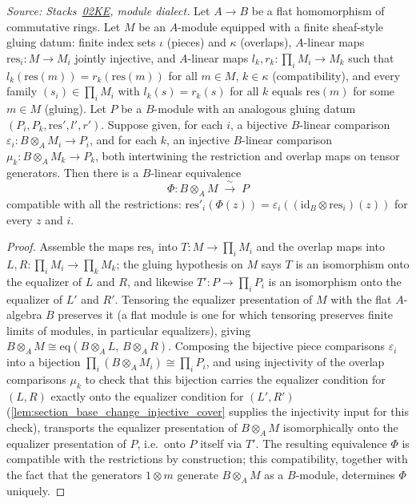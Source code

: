 \begin{lemma}
  \label{lem:section_base_change_gluing_ladder}
  \leanok
  \textit{Source: Stacks~\href{https://stacks.math.columbia.edu/tag/02KE}{02KE},
  module dialect.}
  Let \(A \to B\) be a flat homomorphism of commutative rings. Let \(M\) be
  an \(A\)-module equipped with a finite sheaf-style gluing datum: finite
  index sets \(\iota\) (pieces) and \(\kappa\) (overlaps), \(A\)-linear maps
  \(\mathrm{res}_i : M \to M_i\) jointly injective, and \(A\)-linear maps
  \(l_k, r_k : \prod_i M_i \to M_k\) such that \(l_k(\mathrm{res}(m)) =
  r_k(\mathrm{res}(m))\) for all \(m \in M\), \(k \in \kappa\)
  (compatibility), and every family \((s_i) \in \prod_i M_i\) with
  \(l_k(s) = r_k(s)\) for all \(k\) equals \(\mathrm{res}(m)\) for some
  \(m \in M\) (gluing). Let \(P\) be a \(B\)-module with an analogous
  gluing datum \((P_i, P_k, \mathrm{res}', l', r')\). Suppose given, for
  each \(i\), a bijective \(B\)-linear comparison
  \(\varepsilon_i : B \otimes_A M_i \to P_i\), and for each \(k\), an
  injective \(B\)-linear comparison \(\mu_k : B \otimes_A M_k \to P_k\),
  both intertwining the restriction and overlap maps on tensor generators.
  Then there is a \(B\)-linear equivalence
  \[
    \Phi : B \otimes_A M \;\xrightarrow{\ \sim\ }\; P
  \]
  compatible with all the restrictions:
  \(\mathrm{res}'_i(\Phi(z)) = \varepsilon_i((\mathrm{id}_B \otimes
  \mathrm{res}_i)(z))\) for every \(z\) and \(i\).
\end{lemma}
\begin{proof}\leanok
  Assemble the maps \(\mathrm{res}_i\) into \(T : M \to \prod_i M_i\) and
  the overlap maps into \(L, R : \prod_i M_i \to \prod_k M_k\); the gluing
  hypothesis on \(M\) says \(T\) is an isomorphism onto the equalizer of
  \(L\) and \(R\), and likewise \(T' : P \to \prod_i P_i\) is an
  isomorphism onto the equalizer of \(L'\) and \(R'\). Tensoring the
  equalizer presentation of \(M\) with the flat \(A\)-algebra \(B\)
  preserves it (a flat module is one for which tensoring preserves finite
  limits of modules, in particular equalizers), giving
  \(B \otimes_A M \cong \mathrm{eq}(B \otimes_A L,\, B \otimes_A R)\).
  Composing the bijective piece comparisons \(\varepsilon_i\) into a
  bijection \(\prod_i(B \otimes_A M_i) \cong \prod_i P_i\), and using
  injectivity of the overlap comparisons \(\mu_k\) to check that this
  bijection carries the equalizer condition for \((L,R)\) exactly onto the
  equalizer condition for \((L',R')\) (\cref{lem:section_base_change_injective_cover}
  supplies the injectivity input for this check), transports the equalizer
  presentation of \(B \otimes_A M\) isomorphically onto the equalizer
  presentation of \(P\), i.e.\ onto \(P\) itself via \(T'\). The resulting
  equivalence \(\Phi\) is compatible with the restrictions by construction;
  this compatibility, together with the fact that the generators
  \(1 \otimes m\) generate \(B \otimes_A M\) as a \(B\)-module, determines
  \(\Phi\) uniquely.
\end{proof}

